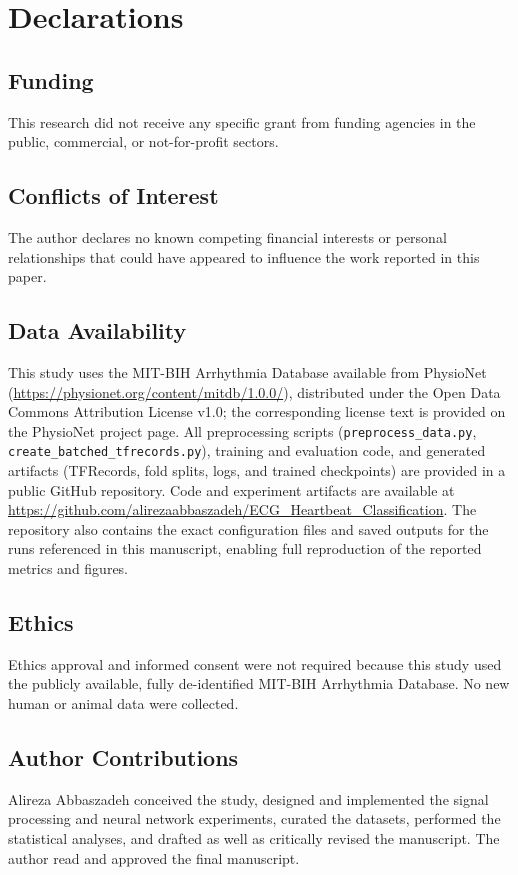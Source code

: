 \section*{Declarations}

\subsection*{Funding}
This research did not receive any specific grant from funding agencies in the public, commercial, or not-for-profit sectors.

\subsection*{Conflicts of Interest}
The author declares no known competing financial interests or personal relationships that could have appeared to influence the work reported in this paper.

\subsection*{Data Availability}
This study uses the MIT-BIH Arrhythmia Database available from PhysioNet (\url{https://physionet.org/content/mitdb/1.0.0/}), distributed under the Open Data Commons Attribution License v1.0; the corresponding license text is provided on the PhysioNet project page. All preprocessing scripts (\texttt{preprocess\_data.py}, \texttt{create\_batched\_tfrecords.py}), training and evaluation code, and generated artifacts (TFRecords, fold splits, logs, and trained checkpoints) are provided in a public GitHub repository. Code and experiment artifacts are available at \url{https://github.com/alirezaabbaszadeh/ECG_Heartbeat_Classification}. The repository also contains the exact configuration files and saved outputs for the runs referenced in this manuscript, enabling full reproduction of the reported metrics and figures.

\subsection*{Ethics}
Ethics approval and informed consent were not required because this study used the publicly available, fully de-identified MIT-BIH Arrhythmia Database. No new human or animal data were collected.

\subsection*{Author Contributions}
Alireza Abbaszadeh conceived the study, designed and implemented the signal processing and neural network experiments, curated the datasets, performed the statistical analyses, and drafted as well as critically revised the manuscript. The author read and approved the final manuscript.

